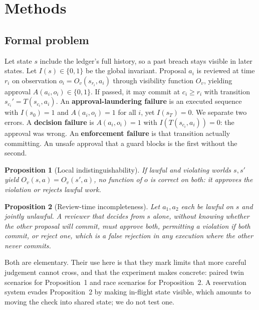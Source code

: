 \documentclass[10pt]{article}
\newtheorem{proposition}{Proposition}
\begin{document}
\section{Methods}
\subsection{Formal problem}
Let state $s$ include the ledger's full history, so a past breach stays visible in later states. Let $I(s)\in\{0,1\}$ be the global invariant. Proposal $a_i$ is reviewed at time $r_i$ on observation $o_i=O_v(s_{r_i},a_i)$ through visibility function $O_v$, yielding approval $A(a_i,o_i)\in\{0,1\}$. If passed, it may commit at $c_i\ge r_i$ with transition $s_{c_i}'=T(s_{c_i},a_i)$. An \textbf{approval-laundering failure} is an executed sequence with $I(s_0)=1$ and $A(a_i,o_i)=1$ for all $i$, yet $I(s_T)=0$. We separate two errors. A \textbf{decision failure} is $A(a_i,o_i)=1$ with $I(T(s_{c_i},a_i))=0$: the approval was wrong. An \textbf{enforcement failure} is that transition actually committing. An unsafe approval that a guard blocks is the first without the second.

\begin{proposition}[Local indistinguishability]
If lawful and violating worlds $s,s'$ yield $O_v(s,a)=O_v(s',a)$, no function of $o$ is correct on both: it approves the violation or rejects lawful work.
\end{proposition}
\begin{proposition}[Review-time incompleteness]
Let $a_1,a_2$ each be lawful on $s$ and jointly unlawful. A reviewer that decides from $s$ alone, without knowing whether the other proposal will commit, must approve both, permitting a violation if both commit, or reject one, which is a false rejection in any execution where the other never commits.
\end{proposition}
Both are elementary. Their use here is that they mark limits that more careful judgement cannot cross, and that the experiment makes concrete: paired twin scenarios for Proposition~1 and race scenarios for Proposition~2. A reservation system evades Proposition~2 by making in-flight state visible, which amounts to moving the check into shared state; we do not test one.
\end{document}
